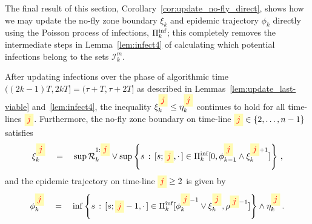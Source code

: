 \documentclass[]{article}
\newcommand{\Infections}{\mathcal{I}}
\newcommand{\Removals}{\mathcal{R}}
\newcommand{\Poisson}{\Pi}
\newcommand{\PoissonInf}{\Poisson^\textup{inf}}
\newcommand{\infectee}{{\colorbox{yellow!30}{$\textcolor{red}{j}$}}}
\begin{document}
The final result of this section, Corollary~\ref{cor:update_no-fly_direct}, 
shows how we may update the no-fly zone boundary \(\xi_k\) and epidemic trajectory \(\phi_k\) 
directly using the Poisson process of infections, \(\PoissonInf_k\); 
this completely removes the intermediate steps in Lemma~\ref{lem:infect4} 
of calculating which potential infections belong to the sets \(\Infections_k^m\).

\begin{cor}\label{cor:update_no-fly_direct}
	After updating infections over the phase of algorithmic time \(((2k{-}1)T, 2kT] =(\tau+T, \tau+2T] \) 
	as described in Lemmas~\ref{lem:update_last-viable} and~\ref{lem:infect4}, 
	the inequality \(\xi^\infectee_k \le \eta^\infectee_k\) continues to hold for all time-lines \(\infectee\). 
	Furthermore, the no-fly zone boundary on time-line \(\infectee\in\{2,\dots,n-1\}\) satisfies 
	\begin{equation}\label{eq:update_no-fly_direct}
		\xi^\infectee_k 
\quad=\quad 
\sup \Removals^{1:\infectee}_k \vee 
\sup\left\{s\,:\,[s;\infectee,\cdot\,]
			\in\PoissonInf_k[0,\phi^\infectee_{k-1}\wedge \xi^{\infectee+1}_k]\right\}\,,
	\end{equation}
	and the epidemic trajectory on time-line \(\infectee\ge 2\) is given by
	\begin{equation}\label{eq:update_epidemic-trajectory_direct}
	\phi^\infectee_k 
\quad=\quad
\inf \left\{s\,:\,[s;\infectee-1,\cdot\,]
		\in\PoissonInf_k[\phi^{\infectee-1}_k \vee \xi^\infectee_k,\rho^{\infectee-1}]\right\}
			\wedge \eta^\infectee_k\,.
	\end{equation}
\end{cor}
\end{document}
